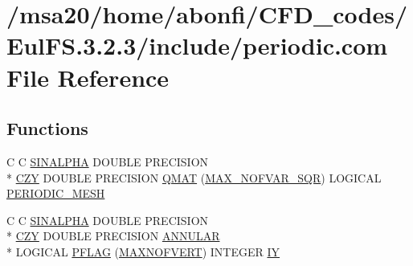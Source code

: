 \hypertarget{msa20_2home_2abonfi_2_c_f_d__codes_2_eul_f_s_83_82_83_2include_2periodic_8com}{\section{/msa20/home/abonfi/\-C\-F\-D\-\_\-codes/\-Eul\-F\-S.3.2.3/include/periodic.com File Reference}
\label{msa20_2home_2abonfi_2_c_f_d__codes_2_eul_f_s_83_82_83_2include_2periodic_8com}
}
\subsection*{Functions}
\begin{DoxyCompactItemize}
\item 
C C \hyperlink{msa20_2home_2abonfi_2_c_f_d__codes_2_eul_f_s_83_82_83_2include_2periodic_8com_a97ced9baaec7d3d0578e199bfd823079}{S\-I\-N\-A\-L\-P\-H\-A} D\-O\-U\-B\-L\-E P\-R\-E\-C\-I\-S\-I\-O\-N \\*
\hyperlink{msa20_2home_2abonfi_2_c_f_d__codes_2_eul_f_s_83_82_83_2include_2periodic_8com_ad175bdbeeae72f2f20cdf0245e8a54a9}{C\-Z\-Y} D\-O\-U\-B\-L\-E P\-R\-E\-C\-I\-S\-I\-O\-N \hyperlink{msa20_2home_2abonfi_2_c_f_d__codes_2_eul_f_s_83_82_83_2include_2periodic_8com_a6c6fc0d4d935035139f984a182d51c81}{Q\-M\-A\-T} (\hyperlink{msa20_2home_2abonfi_2_c_f_d__codes_2_eul_f_s_83_82_83_2include_2paramt_8h_a7655047f32c8c333f5412ebb47ac3e25}{M\-A\-X\-\_\-\-N\-O\-F\-V\-A\-R\-\_\-\-S\-Q\-R}) L\-O\-G\-I\-C\-A\-L \hyperlink{msa20_2home_2abonfi_2_c_f_d__codes_2_eul_f_s_83_82_83_2include_2periodic_8com_ac3a32540fe85c887d20996f79e007052}{P\-E\-R\-I\-O\-D\-I\-C\-\_\-\-M\-E\-S\-H}
\item 
C C \hyperlink{msa20_2home_2abonfi_2_c_f_d__codes_2_eul_f_s_83_82_83_2include_2periodic_8com_a97ced9baaec7d3d0578e199bfd823079}{S\-I\-N\-A\-L\-P\-H\-A} D\-O\-U\-B\-L\-E P\-R\-E\-C\-I\-S\-I\-O\-N \\*
\hyperlink{msa20_2home_2abonfi_2_c_f_d__codes_2_eul_f_s_83_82_83_2include_2periodic_8com_ad175bdbeeae72f2f20cdf0245e8a54a9}{C\-Z\-Y} D\-O\-U\-B\-L\-E P\-R\-E\-C\-I\-S\-I\-O\-N \hyperlink{msa20_2home_2abonfi_2_c_f_d__codes_2_eul_f_s_83_82_83_2include_2periodic_8com_aa6bf10e1571aac3f210a013ab517b524}{A\-N\-N\-U\-L\-A\-R} \\*
L\-O\-G\-I\-C\-A\-L \hyperlink{msa20_2home_2abonfi_2_c_f_d__codes_2_eul_f_s_83_82_83_2include_2periodic_8com_a6abf4336aa179c84ce27efc0f0ec557e}{P\-F\-L\-A\-G} (\hyperlink{msa20_2home_2abonfi_2_c_f_d__codes_2_eul_f_s_83_82_83_2include_2paramt_8h_ab61232bd83657eade2904454f444f477}{M\-A\-X\-N\-O\-F\-V\-E\-R\-T}) I\-N\-T\-E\-G\-E\-R \hyperlink{msa20_2home_2abonfi_2_c_f_d__codes_2_eul_f_s_83_82_83_2include_2periodic_8com_acb7802073544a0762d4cc8d59b3dbc01}{I\-Y}
\end{DoxyCompactItemize}
